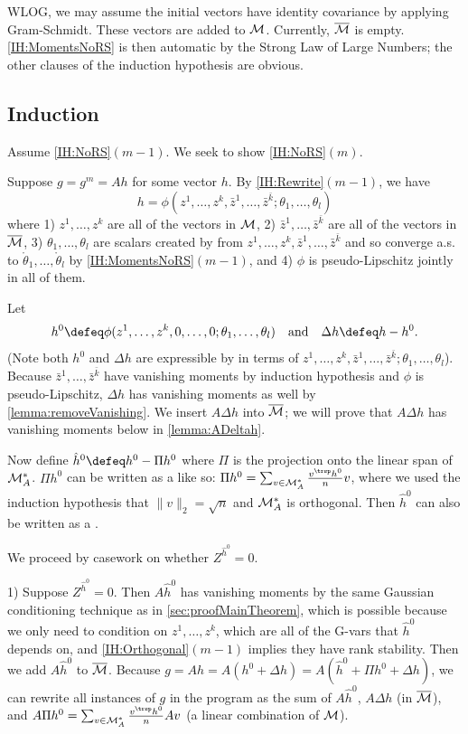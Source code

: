 \documentclass[main.tex]{subfiles}
\begin{document}
WLOG, we may assume the initial vectors have identity covariance by applying Gram-Schmidt. These vectors are added to $\mathcal{M}$. Currently, $\overline{\mathcal{M}}$ is empty. \ref{IH:MomentsNoRS} is then automatic by the Strong Law of Large Numbers; the other clauses of the induction hypothesis are obvious.

\subsection{Induction}

Assume \ref{IH:NoRS}$(m-1)$. We seek to show \ref{IH:NoRS}$(m)$.

Suppose $g=g^{m}=Ah$ for some vector $h$. By \ref{IH:Rewrite}$(m-1)$, we have \[h=\phi(z^{1},\ldots,z^{k},\bar{z}^{1},\ldots,\bar{z}^{\bar{k}};\theta_{1},\ldots,\theta_{l})\] where 1) $z^{1},\ldots,z^{k}$ are all of the vectors in $\mathcal{M}$, 2) $\bar{z}^{1},\ldots,\bar{z}^{\bar{k}}$ are all of the vectors in $\overline{\mathcal{M}}$, 3) $\theta_{1},\ldots,\theta_{l}$ are scalars created by  from $z^{1},\ldots,z^{k},\bar{z}^{1},\ldots,\bar{z}^{\bar{k}}$ and so converge a.s. to $\mathring{\theta}_{1},\ldots,\mathring{\theta}_{l}$ by \ref{IH:MomentsNoRS}$(m-1)$, and 4) $\phi$ is pseudo-Lipschitz jointly in all of them.

Let 
\[h^{0}\defeq\phi(z^{1},\ldots,z^{k},0,\ldots,0;\theta_{1},\ldots,\theta_{l}) \quad\text{and}\quad \Delta h\defeq h-h^{0}.\] (Note both $h^{0}$ and $\Delta h$ are expressible by  in terms of $z^{1},\ldots,z^{k},\bar{z}^{1},\ldots,\bar{z}^{\bar{k}};\theta_{1},\ldots,\theta_{l}$). Because $\bar{z}^{1},\ldots,\bar{z}^{\bar{k}}$ have vanishing moments by induction hypothesis and $\phi$ is pseudo-Lipschitz, $\Delta h$ has vanishing moments as well by \cref{lemma:removeVanishing}. We insert $A\Delta h$ into $\overline{\mathcal{M}}$; we will prove that $A\Delta h$ has vanishing moments below in \cref{lemma:ADeltah}.

Now define $\hat{h}^{0}\defeq h^{0}-\Pi h^{0}$ where $\Pi$ is the projection onto the linear span of $\mathcal{M}_{A}^{*}$. $\Pi h^{0}$ can be written as a  like so: $\Pi h^{0}=\sum_{v\in\coreset_{A}^{*}}\frac{v^{\trsp}h^{0}}{n}v$, where we used the induction hypothesis that $\|v\|_{2}=\sqrt{n}$ and $\mathcal{M}_{A}^{*}$ is orthogonal. Then $\hat{h}^{0}$ can also be written as a .

We proceed by casework on whether $Z^{\hat{h}^{0}}=0$.

1) Suppose $Z^{\hat{h}^{0}}=0$. Then $A\hat{h}^{0}$ has vanishing moments by the same Gaussian conditioning technique as in \cref{sec:proofMainTheorem}, which is possible because we only need to condition on $z^{1},\ldots,z^{k}$, which are all of the G-vars that $\hat{h}^{0}$ depends on, and \ref{IH:Orthogonal}$(m-1)$ implies they have rank stability. Then we add $A\hat{h}^{0}$ to $\overline{\mathcal{M}}$. Because $g=Ah=A(h^{0}+\Delta h)=A(\hat{h}^{0}+\Pi h^{0}+\Delta h)$, we can rewrite all instances of $g$ in the program as the sum of $A\hat{h}^{0}$, $A\Delta h$ (in $\overline{\mathcal{M}}$), and $A\Pi h^{0}=\sum_{v\in\coreset_{A}^{*}}\frac{v^{\trsp}h^{0}}{n}Av$ (a linear combination of $\mathcal{M}$).
\end{document}
